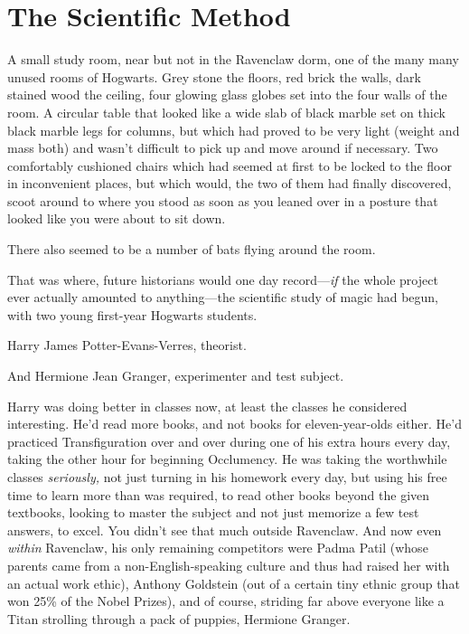 \chapter{The Scientific Method}

\lettrine{A}{} small study room, near but not in the Ravenclaw dorm, one of the many many
unused rooms of Hogwarts. Grey stone the floors, red brick the walls, dark
stained wood the ceiling, four glowing glass globes set into the four walls of
the room. A circular table that looked like a wide slab of black marble set on
thick black marble legs for columns, but which had proved to be very light
(weight and mass both) and wasn't difficult to pick up and move around if
necessary. Two comfortably cushioned chairs which had seemed at first to be
locked to the floor in inconvenient places, but which would, the two of them
had finally discovered, scoot around to where you stood as soon as you leaned
over in a posture that looked like you were about to sit down.

There also seemed to be a number of bats flying around the room.

That was where, future historians would one day record---\emph{if} the whole
project ever actually amounted to anything---the scientific study of magic had
begun, with two young first-year Hogwarts students.

Harry James Potter-Evans-Verres, theorist.

And Hermione Jean Granger, experimenter and test subject.

Harry was doing better in classes now, at least the classes he considered
interesting. He'd read more books, and not books for eleven-year-olds either.
He'd practiced Transfiguration over and over during one of his extra hours
every day, taking the other hour for beginning Occlumency. He was taking the
worthwhile classes \emph{seriously,} not just turning in his homework every
day, but using his free time to learn more than was required, to read other
books beyond the given textbooks, looking to master the subject and not just
memorize a few test answers, to excel. You didn't see that much outside
Ravenclaw. And now even \emph{within} Ravenclaw, his only remaining competitors
were Padma Patil (whose parents came from a non-English-speaking culture and
thus had raised her with an actual work ethic), Anthony Goldstein (out of a
certain tiny ethnic group that won 25\% of the Nobel Prizes), and of course,
striding far above everyone like a Titan strolling through a pack of puppies,
Hermione Granger.

